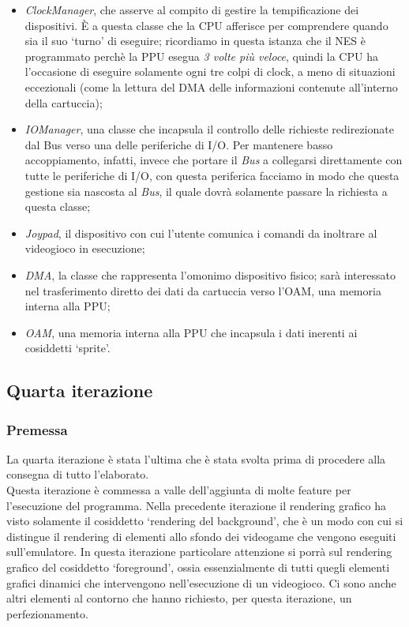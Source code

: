 \documentclass[11pt]{article}
\begin{document}
\begin{itemize}
\item{
	\emph{ClockManager}, che asserve al compito di gestire la tempificazione dei dispositivi. È a questa classe che la CPU afferisce per comprendere quando sia il suo `turno' di eseguire;
	ricordiamo in questa istanza che il NES è programmato perchè la PPU esegua \emph{3 volte più veloce}, quindi la CPU ha l'occasione di eseguire solamente ogni tre colpi di clock,
	a meno di situazioni eccezionali (come la lettura del DMA delle informazioni contenute all'interno della cartuccia);
}
\item{
	\emph{IOManager}, una classe che incapsula il controllo delle richieste redirezionate dal Bus verso una delle periferiche di I/O. Per mantenere basso accoppiamento, infatti, invece
	che portare il \emph{Bus} a collegarsi direttamente con tutte le periferiche di I/O, con questa periferica facciamo in modo che questa gestione sia nascosta al \emph{Bus}, il quale
	dovrà solamente passare la richiesta a questa classe;
}
\item{
	\emph{Joypad}, il dispositivo con cui l'utente comunica i comandi da inoltrare al videogioco in esecuzione;
}
\item{
	\emph{DMA}, la classe che rappresenta l'omonimo dispositivo fisico; sarà interessato nel trasferimento diretto dei dati da cartuccia verso l'OAM, una memoria interna alla PPU;
}
\item{
	\emph{OAM}, una memoria interna alla PPU che incapsula i dati inerenti ai cosiddetti `sprite'.
}
\end{itemize}
\clearpage
\subsection{Quarta iterazione}
\subsubsection{Premessa}
La quarta iterazione è stata l'ultima che è stata svolta prima di procedere alla consegna di tutto l'elaborato.\\
Questa iterazione è commessa a valle dell'aggiunta di molte feature per l'esecuzione del programma. Nella precedente iterazione il rendering grafico ha visto solamente il cosiddetto `rendering del background', che è un modo con cui si distingue il rendering di elementi allo sfondo dei videogame che vengono eseguiti sull'emulatore. In questa iterazione particolare attenzione si porrà sul rendering grafico del cosiddetto `foreground', ossia essenzialmente di tutti quegli elementi grafici dinamici che intervengono nell'esecuzione di un videogioco. Ci sono anche altri elementi al contorno che hanno richiesto, per questa iterazione, un perfezionamento.
\end{document}
